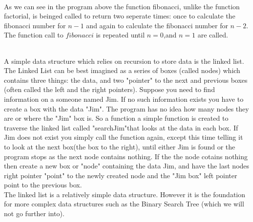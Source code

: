\documentclass{article}
\begin{document}
	
\begin{comment}
n=4
f(3)f(2)
f(
\end{comment}
~\\
As we can see in the program above the function fibonacci, unlike the function factorial, is beinged called to return two seperate times: once to calculate the fibonacci number for $n-1$ and again to calculate the fibonacci number for $n-2$.  The function call to $fibonacci$ is repeated until $n=0$,and $n=1$ are called.    

~\\A simple data structure which relies on recursion to store data is the linked list.  The Linked List can be best imagined as a series of boxes (called nodes) which contains three things: the data, and two "pointer" to the next and previous boxes (often called the left and the right pointers). Suppose you need to find information on a someone named Jim. If no such information exists you have to create a box with the data "Jim". The program has no idea how many nodes they are or where the "Jim" box is. So a function a simple function is created to traverse the linked list called "searchJim"that looks at the data in each box.  If Jim does not exist you simply call the function again, except this time telling it to look at the next box(the box to the right), until either Jim is found or the program stops as the next node contains nothing. If the the node cotains nothing then create a new box or "node" containing the data Jim, and have the last nodes right pointer "point" to the newly created node and the "Jim box" left pointer point to the previous box.                 	
\\
The linked list is a relatively simple data structure.  However it is the foundation for more complex data structures such as the Binary Search Tree (which we will not go further into).
\end{document}
